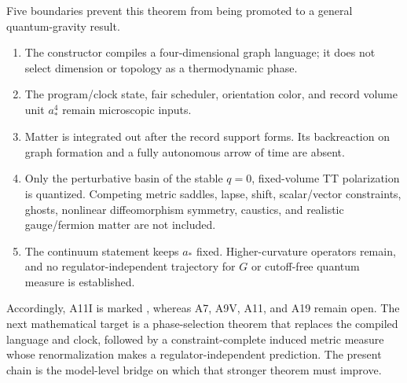 Five boundaries prevent this theorem from being promoted to a general
quantum-gravity result.
\begin{enumerate}
\item The constructor compiles a four-dimensional graph language; it does
not select dimension or topology as a thermodynamic phase.
\item The program/clock state, fair scheduler, orientation color, and record
volume unit \(a_*^4\) remain microscopic inputs.
\item Matter is integrated out after the record support forms.  Its
backreaction on graph formation and a fully autonomous arrow of time are
absent.
\item Only the perturbative basin of the stable \(q=0\), fixed-volume TT
polarization is quantized.  Competing metric saddles, lapse, shift,
scalar/vector constraints, ghosts, nonlinear diffeomorphism symmetry,
caustics, and realistic gauge/fermion matter are not included.
\item The continuum statement keeps \(a_*\) fixed.  Higher-curvature
operators remain, and no regulator-independent trajectory for \(G\) or
cutoff-free quantum measure is established.
\end{enumerate}

Accordingly, A11I is marked \StatusModel, whereas A7, A9V, A11, and A19
remain open.  The next mathematical target is a phase-selection theorem that
replaces the compiled language and clock, followed by a constraint-complete
induced metric measure whose renormalization makes a regulator-independent
prediction.  The present chain is the model-level bridge on which that
stronger theorem must improve.

